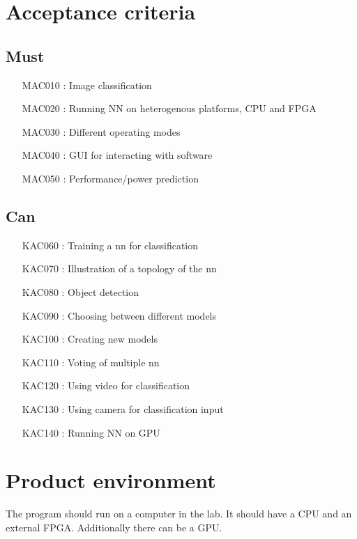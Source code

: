 \documentclass[parskip=full]{scrartcl}
\begin{document}
\section{Acceptance criteria}
\subsection{Must}
\begin{itemize}[nosep]
\item [MAC010]: Image classification
\item [MAC020]: Running NN on heterogenous platforms, CPU and FPGA
\item [MAC030]: Different operating modes
\item [MAC040]: GUI for interacting with software
\item [MAC050]: Performance/power prediction
\end{itemize}

\subsection{Can}
\begin{itemize}[nosep]
\item [KAC060]: Training a nn for classification
\item [KAC070]: Illustration of a topology of the nn
\item [KAC080]: Object detection
\item [KAC090]: Choosing between different models
\item [KAC100]: Creating new models
\item [KAC110]: Voting of multiple nn
\item [KAC120]: Using video for classification
\item [KAC130]: Using camera for classification input
\item [KAC140]: Running NN on GPU
\end{itemize}

\section{Product environment}
The program should run on a computer in the lab. It should have a CPU and an external FPGA. Additionally there can be a GPU.
\end{document}
